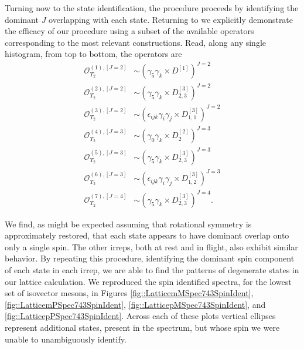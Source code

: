 Turning now to the state identification, the procedure proceeds by identifying the dominant $J$ overlapping with each state. Returning to   we explicitly demonstrate the efficacy of our  procedure using a subset of the available operators corresponding to the most relevant constructions. Read, along any single histogram, from top to bottom, the operators are 
\begin{align*}
\mathcal{O}_{T_2}^{(1),[J=2]} &\sim \left( \gamma_5\gamma_k \times D^{[1]} \right)^{J=2}   \\
\mathcal{O}_{T_2}^{(2),[J=2]} &\sim  \left( \gamma_5\gamma_k \times D^{[3]}_{2,3}\right)^{J=2}   \\
\mathcal{O}_{T_2}^{(3),[J=2]} &\sim  \left( \epsilon_{ijk} \gamma_i\gamma_j \times D^{[3]}_{1,1} \right)^{J=2}   \\
\mathcal{O}_{T_2}^{(4),[J=3]} &\sim  \left( \gamma_0 \gamma_k \times D^{[2]}_2 \right)^{J=3}  \\
\mathcal{O}_{T_2}^{(5),[J=3]} &\sim  \left( \gamma_5\gamma_k \times D^{[3]}_{2,3} \right)^{J=3}   \\
\mathcal{O}_{T_2}^{(6),[J=3]} &\sim  \left( \epsilon_{ijk} \gamma_i\gamma_j \times D^{[3]}_{1,2}\right)^{J=3}   \\
\mathcal{O}_{T_2}^{(7),[J=4]} &\sim  \left( \gamma_5\gamma_k \times D^{[3]}_{2,3}\right)^{J=4} .  
\end{align*}

We find, as might be expected assuming that rotational symmetry is approximately restored, that each state appears to have dominant overlap onto only a single spin. The other irreps, both at rest and in flight, also exhibit similar behavior. By repeating this procedure, identifying the dominant spin component of each state in each irrep, we are able to find the patterns of degenerate states in our lattice calculation. We reproduced the spin identified spectra, for the lowest set of isovector mesons, in Figures \ref{fig::LatticemMSpec743SpinIdent}, \ref{fig::LatticemPSpec743SpinIdent}, \ref{fig::LatticepMSpec743SpinIdent}, and \ref{fig::LatticepPSpec743SpinIdent}. Across each of these plots vertical ellipses represent additional states, present in the spectrum, but whose spin we were unable to unambiguously identify.

